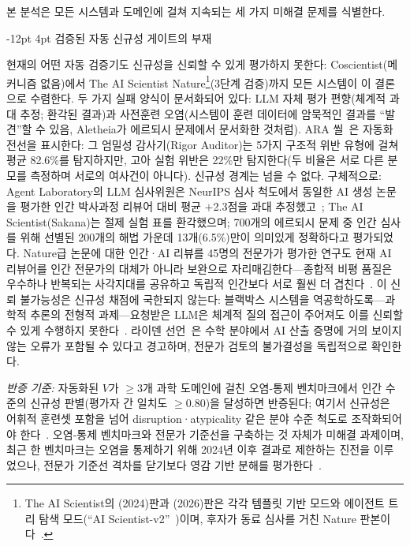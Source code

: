 \documentclass[11pt]{article}
\makeatletter
\renewcommand\subsection{\@startsection{subsection}{2}{\z@}%
  {-12pt \@plus -2pt \@minus -2pt}%
  {4pt \@plus 1pt}%
  {\normalfont\normalsize\bfseries}}
\makeatother
\begin{document}
본 분석은 모든 시스템과 도메인에 걸쳐 지속되는 세 가지 미해결 문제를 식별한다.

\subsection{검증된 자동 신규성 게이트의 부재}

현재의 어떤 자동 검증기도 신규성을 신뢰할 수 있게 평가하지 못한다: Coscientist(메커니즘 없음)에서 The AI Scientist Nature\footnote{The AI Scientist의 (2024)판과 (2026)판은 각각 템플릿 기반 모드와 에이전트 트리 탐색 모드(``AI Scientist-v2''~\citep{yamada2025aiscientistv2})이며, 후자가 동료 심사를 거친 Nature 판본이다~\citep{lu2026aiscientist}.}(3단계 검증)까지 모든 시스템이 이 결론으로 수렴한다. 두 가지 실패 양식이 문서화되어 있다: LLM 자체 평가 편향(체계적 과대 추정; 환각된 결과)과 사전훈련 오염(시스템이 훈련 데이터에 암묵적인 결과를 ``발견''할 수 있음, Aletheia가 에르되시 문제에서 문서화한 것처럼). ARA 씰~\citep{liu2026lasthuman}은 자동화 전선을 표시한다: 그 엄밀성 감사기(Rigor Auditor)는 5가지 구조적 위반 유형에 걸쳐 평균 82.6\%를 탐지하지만, 고아 실험 위반은 22\%만 탐지한다(두 비율은 서로 다른 분모를 측정하며 서로의 여사건이 아니다). 신규성 경계는 넘을 수 없다. 구체적으로: Agent Laboratory의 LLM 심사위원은 NeurIPS 심사 척도에서 동일한 AI 생성 논문을 평가한 인간 박사과정 리뷰어 대비 평균 $+$2.3점을 과대 추정했고~\citep{schmidgall2025agentlab}; The AI Scientist(Sakana)는 절제 실험 표를 환각했으며; 700개의 에르되시 문제 중 인간 심사를 위해 선별된 200개의 해법 가운데 13개(6.5\%)만이 의미있게 정확하다고 평가되었다. Nature급 논문에 대한 인간·AI 리뷰를 45명의 전문가가 평가한 연구도 현재 AI 리뷰어를 인간 전문가의 대체가 아니라 보완으로 자리매김한다---종합적 비평 품질은 우수하나 반복되는 사각지대를 공유하고 독립적 인간보다 서로 훨씬 더 겹친다~\citep{kim2026aireviewers}. 이 신뢰 불가능성은 신규성 채점에 국한되지 않는다: 블랙박스 시스템을 역공학하도록---과학적 추론의 전형적 과제---요청받은 LLM은 체계적 질의 접근이 주어져도 이를 신뢰할 수 있게 수행하지 못한다~\citep{geng2025reliable}. 라이덴 선언~\citep{leiden2026}은 수학 분야에서 AI 산출 증명에 거의 보이지 않는 오류가 포함될 수 있다고 경고하며, 전문가 검토의 불가결성을 독립적으로 확인한다.

\textit{반증 기준:} 자동화된 $V$가 $\geq$3개 과학 도메인에 걸친 오염-통제 벤치마크에서 인간 수준의 신규성 판별(평가자 간 일치도 $\geq$0.80)을 달성하면 반증된다; 여기서 신규성은 어휘적 훈련셋 포함을 넘어 disruption·atypicality 같은 분야 수준 척도로 조작화되어야 한다~\citep{park2023disruptive,uzzi2013atypical}. 오염-통제 벤치마크와 전문가 기준선을 구축하는 것 자체가 미해결 과제이며, 최근 한 벤치마크는 오염을 통제하기 위해 2024년 이후 결과로 제한하는 진전을 이루었으나, 전문가 기준선 격차를 닫기보다 영감 기반 분해를 평가한다~\citep{liu2025researchbench}.
\end{document}
